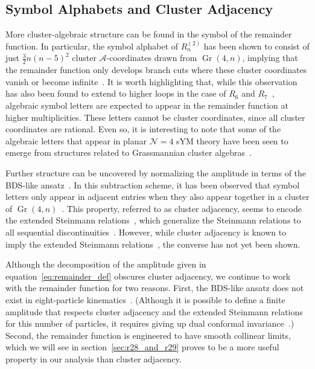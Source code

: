 \documentclass[11pt]{article}
\DeclareMathOperator{\Gr}{Gr}
\begin{document}
\subsection{Symbol Alphabets and Cluster Adjacency}

More cluster-algebraic structure can be found in the symbol of the remainder function. In particular, the symbol alphabet of $R_n^{(2)}$\! has been shown to consist of just $\frac{3}{2} n (n - 5)^2$ cluster $\mathcal{A}$-coordinates drawn from $\Gr(4,n)$, implying that the remainder function only develops branch cuts where these cluster coordinates vanish or become infinite~\cite{Golden:2013xva}. It is worth highlighting that, while this observation has also been found to extend to higher loops in the case of $R_6$ and $R_7$~\cite{Caron-Huot:2020bkp,Prlina:2018ukf}, algebraic symbol letters are expected to appear in the remainder function at higher multiplicities. These letters cannot be cluster coordinates, since all cluster coordinates are rational. Even so, it is interesting to note that some of the algebraic letters that appear in planar $\mathcal{N}=4$ sYM theory have been seen to emerge from structures related to Grassmannian cluster algebras~\cite{Drummond:2019cxm,Arkani-Hamed:2019rds,Henke:2019hve,Drummond:2020kqg,Mago:2020kmp,He:2020uhb,Herderschee:2021dez}. 

Further structure can be uncovered by normalizing the amplitude in terms of the BDS-like ansatz~\cite{Alday:2009dv,Yang:2010as}. In this subtraction scheme, it has been observed that symbol letters only appear in adjacent entries when they also appear together in a cluster of $\Gr(4,n)$~\cite{Drummond:2017ssj}. This property, referred to as cluster adjacency, seems to encode the extended Steinmann relations~\cite{Caron-Huot:2018dsv,Caron-Huot:2019bsq}, which generalize the Steinmann relations to all sequential discontinuities~\cite{Steinmann,Steinmann2,Cahill:1973qp}. However, while cluster adjacency is known to imply the extended Steinmann relations~\cite{Golden:2019kks}, the converse has not yet been shown.


Although the decomposition of the amplitude given in equation~\eqref{eq:remainder_def} obscures cluster adjacency, we continue to work with the remainder function for two reasons. First, the BDS-like ansatz does not exist in eight-particle kinematics~\cite{Yang:2010as}. (Although it is possible to define a finite amplitude that respects cluster adjacency and the extended Steinmann relations for this number of particles, it requires giving up dual conformal invariance~\cite{Golden:2018gtk}.) Second, the remainder function is engineered to have smooth collinear limits, which we will see in section~\ref{sec:r28_and_r29} proves to be a more useful property in our analysis than cluster adjacency. 
\end{document}
